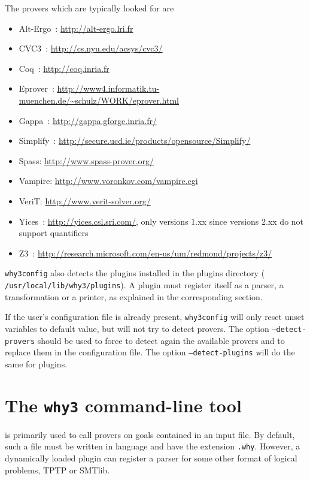 The provers which are typically looked for are
\begin{itemize}
\item Alt-Ergo~\cite{conchon08smt,ergo}: \url{http://alt-ergo.lri.fr}
\item CVC3~\cite{BarTin-CAV-07}: \url{http://cs.nyu.edu/acsys/cvc3/}
\item Coq~\cite{CoqArt}: \url{http://coq.inria.fr}
\item Eprover~\cite{schulz04ijcar}: \url{http://www4.informatik.tu-muenchen.de/~schulz/WORK/eprover.html}
\item Gappa~\cite{melquiond08rnc}: \url{http://gappa.gforge.inria.fr/}
\item Simplify~\cite{simplify05}: \url{http://secure.ucd.ie/products/opensource/Simplify/}
\item Spass: \url{http://www.spass-prover.org/}
\item Vampire: \url{http://www.voronkov.com/vampire.cgi}
\item VeriT: \url{http://www.verit-solver.org/}
\item Yices~\cite{DM06}: \url{http://yices.csl.sri.com/}, only versions 1.xx since versions 2.xx do not support quantifiers
\item Z3~\cite{z3}: \url{http://research.microsoft.com/en-us/um/redmond/projects/z3/}
\end{itemize}

\texttt{why3config} also detects the plugins installed in the \why
plugins directory (\eg{} \texttt{/usr/local/lib/why3/plugins}). A
plugin must register itself as a parser, a transformation or a
printer, as explained in the corresponding section.

If the user's configuration file is already present,
\texttt{why3config} will only reset unset variables to default value,
but will not try to detect provers.
The option \texttt{--detect-provers} should be used to force
\why to detect again the available
provers and to replace them in the configuration file. The option
\texttt{--detect-plugins} will do the same for plugins.

\section{The \texttt{why3} command-line tool}
\label{sec:why3ref}

\why is primarily used to call provers on goals contained in an
input file. By default, such a file must be written in \why language
and have the extension \texttt{.why}. However, a dynamically loaded
plugin can register a parser for some other format of logical problems,
\eg{} TPTP or SMTlib.

